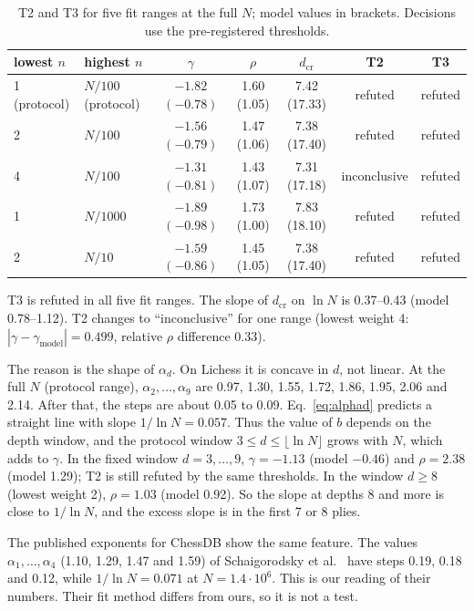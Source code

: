 \documentclass[11pt]{article}
\begin{document}
\begin{table}[t]
\centering\small
\begin{tabular}{llccccc}
\toprule
lowest $n$ & highest $n$ & $\gamma$ & $\rho$ & $d_{\mathrm{cr}}$ & T2 & T3\\
\midrule
1 (protocol) & $N/100$ (protocol) & $-1.82$ $(-0.78)$ & 1.60 (1.05) & 7.42 (17.33) & refuted & refuted\\
2 & $N/100$ & $-1.56$ $(-0.79)$ & 1.47 (1.06) & 7.38 (17.40) & refuted & refuted\\
4 & $N/100$ & $-1.31$ $(-0.81)$ & 1.43 (1.07) & 7.31 (17.18) & inconclusive & refuted\\
1 & $N/1000$ & $-1.89$ $(-0.98)$ & 1.73 (1.00) & 7.83 (18.10) & refuted & refuted\\
2 & $N/10$ & $-1.59$ $(-0.86)$ & 1.45 (1.05) & 7.38 (17.40) & refuted & refuted\\
\bottomrule
\end{tabular}
\caption{T2 and T3 for five fit ranges at the full $N$; model values in brackets. Decisions use the pre-registered thresholds.}
\label{tab:robust}
\end{table}

T3 is refuted in all five fit ranges. The slope of $d_{\mathrm{cr}}$ on $\ln N$ is 0.37--0.43 (model 0.78--1.12). T2 changes to ``inconclusive'' for one range (lowest weight 4: $|\gamma-\gamma_{\mathrm{model}}|=0.499$, relative $\rho$ difference 0.33).

The reason is the shape of $\alpha_d$. On Lichess it is concave in $d$, not linear. At the full $N$ (protocol range), $\alpha_2,\dots,\alpha_9$ are 0.97, 1.30, 1.55, 1.72, 1.86, 1.95, 2.06 and 2.14. After that, the steps are about 0.05 to 0.09. Eq.~\eqref{eq:alphad} predicts a straight line with slope $1/\ln N=0.057$. Thus the value of $b$ depends on the depth window, and the protocol window $3\le d\le\lfloor\ln N\rfloor$ grows with $N$, which adds to $\gamma$. In the fixed window $d=3,\dots,9$, $\gamma=-1.13$ (model $-0.46$) and $\rho=2.38$ (model 1.29); T2 is still refuted by the same thresholds. In the window $d\ge8$ (lowest weight 2), $\rho=1.03$ (model 0.92). So the slope at depths 8 and more is close to $1/\ln N$, and the excess slope is in the first 7 or 8 plies.

The published exponents for ChessDB show the same feature. The values $\alpha_1,\dots,\alpha_4$ (1.10, 1.29, 1.47 and 1.59) of Schaigorodsky et al.~\cite{schaig} have steps 0.19, 0.18 and 0.12, while $1/\ln N=0.071$ at $N=1.4\cdot10^6$. This is our reading of their numbers. Their fit method differs from ours, so it is not a test.
\end{document}
